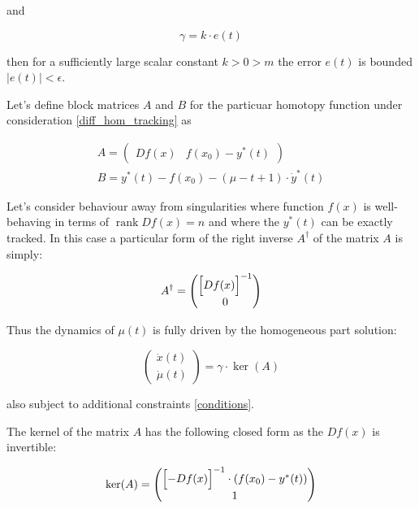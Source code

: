 \documentclass[11pt,american]{article}
\DeclareMathOperator{\rank}{\operatorname{rank}}
\begin{document}
and

\begin{equation}
\gamma = k \cdot e(t)
\end{equation}

then for a sufficiently large scalar constant $k > 0 > m$ the error $e(t)$ is bounded $|e(t)| < \epsilon$.

Let's define block matrices $A$ and $B$ for the particuar homotopy function under consideration \eqref{diff_hom_tracking} as

\begin{equation}\label{conditions}
\begin{gathered}
A = \begin{pmatrix}
D f(x) & f(x_0) - y^*(t)
\end{pmatrix} \\
B = y^*(t) - f(x_0) - (\mu - t + 1) \cdot \dot y^*(t)
\end{gathered}
\end{equation}

Let's consider behaviour away from singularities where function $f(x)$ is well-behaving in terms of $\rank D f(x)=n$ and where the $y^*(t)$ can be exactly tracked.
In this case a particular form of the right inverse $A^\dagger$ of the matrix $A$ is simply:

\begin{equation}
A^\dagger = \begin{pmatrix}
\Bigl[ D f(x) \Bigr]^{-1} \\ 0
\end{pmatrix}
\end{equation}

Thus the dynamics of $\mu(t)$ is fully driven by the homogeneous part solution:

\begin{equation}
\begin{pmatrix} \dot{x}(t) \\ \dot{\mu}(t) \end{pmatrix} = \gamma \cdot \ker(A)
\end{equation}

also subject to additional constraints \eqref{conditions}.

The kernel of the matrix $A$ has the following closed form as the $D f(x)$ is invertible:

\begin{equation}
\ker(A) = \begin{pmatrix}
\Bigl[ - D f(x) \Bigr]^{-1} \cdot (f(x_0) - y^*(t)) \\ 1
\end{pmatrix}
\end{equation}
\end{document}
